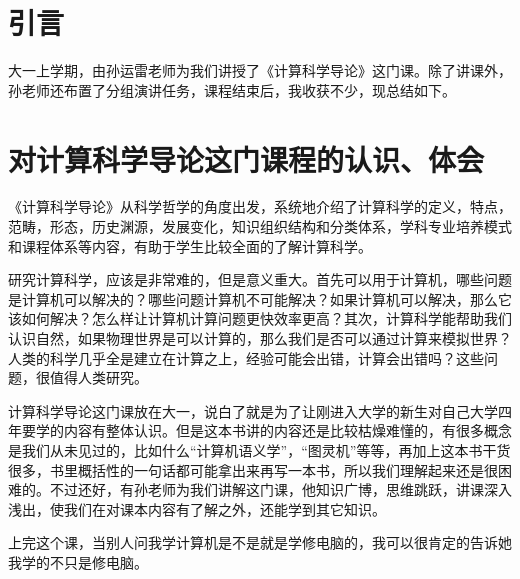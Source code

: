 \documentclass{article}
\begin{document}
\thispagestyle{empty}
\newpage
\setcounter{page}{1}
\section{引言}
大一上学期，由孙运雷老师为我们讲授了《计算科学导论》这门课。除了讲课外，孙老师还布置了分组演讲任务，课程结束后，我收获不少，现总结如下。

\section{对计算科学导论这门课程的认识、体会}

《计算科学导论》从科学哲学的角度出发，系统地介绍了计算科学的定义，特点，范畴，形态，历史渊源，发展变化，知识组织结构和分类体系，学科专业培养模式和课程体系等内容，有助于学生比较全面的了解计算科学。\par 
研究计算科学，应该是非常难的，但是意义重大。首先可以用于计算机，哪些问题是计算机可以解决的？哪些问题计算机不可能解决？如果计算机可以解决，那么它该如何解决？怎么样让计算机计算问题更快效率更高？其次，计算科学能帮助我们认识自然，如果物理世界是可以计算的，那么我们是否可以通过计算来模拟世界？人类的科学几乎全是建立在计算之上，经验可能会出错，计算会出错吗？这些问题，很值得人类研究。\par 
计算科学导论这门课放在大一，说白了就是为了让刚进入大学的新生对自己大学四年要学的内容有整体认识。但是这本书讲的内容还是比较枯燥难懂的，有很多概念是我们从未见过的，比如什么“计算机语义学”，“图灵机”等等，再加上这本书干货很多，书里概括性的一句话都可能拿出来再写一本书，所以我们理解起来还是很困难的。不过还好，有孙老师为我们讲解这门课，他知识广博，思维跳跃，讲课深入浅出，使我们在对课本内容有了解之外，还能学到其它知识。\par 
上完这个课，当别人问我学计算机是不是就是学修电脑的，我可以很肯定的告诉她我学的不只是修电脑。\par 
\end{document}
